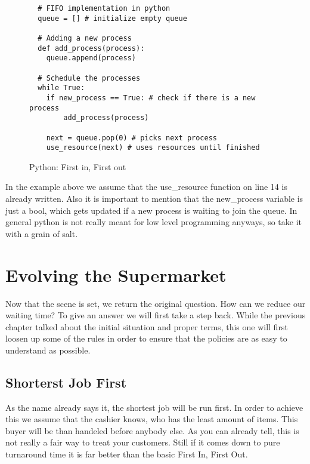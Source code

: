 \begin{figure}[h]
\begin{verbatim}
  # FIFO implementation in python
  queue = [] # initialize empty queue

  # Adding a new process
  def add_process(process):
    queue.append(process)

  # Schedule the processes
  while True:
    if new_process == True: # check if there is a new process
        add_process(process)
    
    next = queue.pop(0) # picks next process
    use_resource(next) # uses resources until finished
\end{verbatim}
\caption{Python: First in, First out}
\label{code:fifo}
\end{figure}
In the example above we assume that the use\_resource function on line 14 is already written.
Also it is important to mention that the new\_process variable is just a bool, which gets updated if a new process is waiting to join the queue.
In general python is not really meant for low level programming anyways, so take it with a grain of salt.


\chapter{Evolving the Supermarket}

Now that the scene is set, we return the original question. 
How can we reduce our waiting time?
To give an answer we will first take a step back.
While the previous chapter talked about the initial situation and proper terms, this one will first loosen up some of the rules in order to ensure that the policies are as easy to understand as possible.

\section{Shorterst Job First}

As the name already says it, the shortest job will be run first.
In order to achieve this we assume that the cashier knows, who has the least amount of items.
This buyer will be than handeled before anybody else. As you can already tell, this is not really a fair way to treat your customers.
Still if it comes down to pure turnaround time it is far better than the basic First In, First Out.

